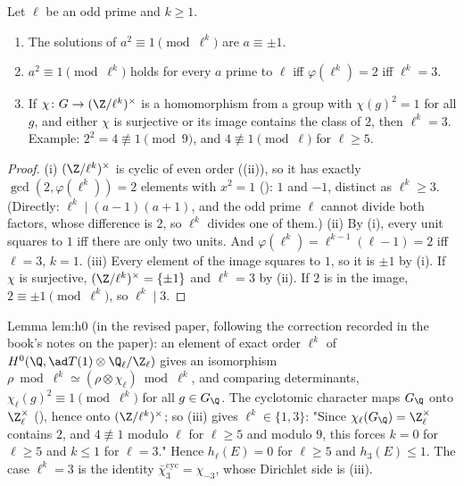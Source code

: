 \begin{corollary}\label{cor:rings:squares-one}
Let $\ell$ be an odd prime and $k\ge1$.
\begin{enumerate}[label=(\roman*)]
\item The solutions of $a^2\equiv1\pmod{\ell^k}$ are $a\equiv\pm1$.
\item $a^2\equiv1\pmod{\ell^k}$ holds for every $a$ prime to $\ell$ iff $\varphi(\ell^k)=2$ iff $\ell^k=3$.
\item If $\chi\colon G\to(\Z/\ell^k)^\times$ is a homomorphism from a group with $\chi(g)^2=1$ for all $g$, and either $\chi$ is surjective or its image
contains the class of $2$, then $\ell^k=3$. Example: $2^2=4\not\equiv1\pmod9$, and $4\not\equiv1\pmod\ell$ for $\ell\ge5$.
\end{enumerate}
\end{corollary}

\begin{proof}
(i) $(\Z/\ell^k)^\times$ is cyclic of even order ((ii)), so it has exactly $\gcd(2,\varphi(\ell^k))=2$ elements with $x^2=1$
(): $1$ and $-1$, distinct as $\ell^k\ge3$. (Directly: $\ell^k\mid(a-1)(a+1)$, and the odd prime $\ell$ cannot divide both factors,
whose difference is $2$, so $\ell^k$ divides one of them.) (ii) By (i), every unit squares to $1$ iff there are only two units. And
$\varphi(\ell^k)=\ell^{k-1}(\ell-1)=2$ iff $\ell=3$, $k=1$. (iii) Every element of the image squares to $1$, so it is $\pm1$ by (i). If $\chi$ is
surjective, $(\Z/\ell^k)^\times=\{\pm1\}$ and $\ell^k=3$ by (ii). If $2$ is in the image, $2\equiv\pm1\pmod{\ell^k}$, so $\ell^k\mid3$.
\end{proof}

\begin{paperlink}\label{pl:rings:h0}
Lemma lem:h0 (in the revised paper, following the correction recorded in the book's notes on the paper): an element of
exact order $\ell^k$ of $H^0(\Q,\ad T(1)\otimes\Q_\ell/\Z_\ell)$ gives an isomorphism $\rho\bmod\ell^k\simeq(\rho\otimes\chi_\ell)\bmod\ell^k$, and comparing
determinants, $\chi_\ell(g)^2\equiv1\pmod{\ell^k}$ for all $g\in G_\Q$. The cyclotomic character maps $G_\Q$ onto $\Z_\ell^\times$ (), hence onto
$(\Z/\ell^k)^\times$; so (iii) gives $\ell^k\in\{1,3\}$: "Since $\chi_\ell(G_\Q)=\Z_\ell^\times$ contains $2$, and $4\not\equiv1$
modulo $\ell$ for $\ell\ge5$ and modulo $9$, this forces $k=0$ for $\ell\ge5$ and $k\le1$ for $\ell=3$." Hence $h_\ell(E)=0$ for $\ell\ge5$ and
$h_3(E)\le1$. The case $\ell^k=3$ is the identity $\bar\chi_3^{\mathrm{cyc}}=\chi_{-3}$, whose Dirichlet side is (iii).
\end{paperlink}

